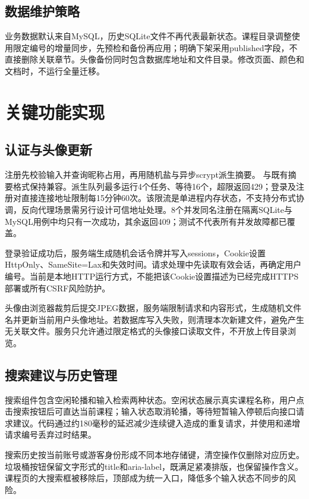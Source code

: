 \documentclass[UTF8,12pt,a4paper,oneside,openany]{ctexbook}
\begin{document}
\section{数据维护策略}

业务数据默认来自MySQL，历史SQLite文件不再代表最新状态。课程目录调整使用限定编号的增量同步，先预检和备份再应用；明确下架采用published字段，不直接删除关联章节。头像备份同时包含数据库地址和文件目录。修改页面、颜色和文档时，不运行全量迁移。


\chapter{关键功能实现}

\section{认证与头像更新}

注册先校验输入并查询昵称占用，再用随机盐与异步scrypt派生摘要。\cite{ref9} 与既有摘要格式保持兼容。派生队列最多运行4个任务、等待16个，超限返回429；登录及注册对直接连接地址限制每15分钟60次。该限流是单进程内存状态，不支持分布式协调，反向代理场景需另行设计可信地址处理。8个并发同名注册在隔离SQLite与MySQL用例中均只有一次成功，其余返回409；测试不代表所有并发故障都已覆盖。


登录验证成功后，服务端生成随机会话令牌并写入sessions，Cookie设置HttpOnly、SameSite=Lax和失效时间。请求处理中先读取有效会话，再确定用户编号。当前是本地HTTP运行方式，不能把该Cookie设置描述为已经完成HTTPS部署或所有CSRF风险防护。


头像由浏览器裁剪后提交JPEG数据，服务端限制请求和内容形式，生成随机文件名并更新当前用户头像地址。若数据库写入失败，则清理本次新建文件，避免产生无关联文件。服务只允许通过限定格式的头像接口读取文件，不开放上传目录浏览。


\section{搜索建议与历史管理}

搜索组件包含空闲轮播和输入检索两种状态。空闲状态展示真实课程名称，用户点击搜索按钮后可直达当前课程；输入状态取消轮播，等待短暂输入停顿后向接口请求建议。代码通过约180毫秒的延迟减少连续键入造成的重复请求，并使用和递增请求编号丢弃过时结果。


搜索历史按当前账号或游客身份形成不同本地存储键，清空操作仅删除对应历史。垃圾桶按钮保留文字形式的title和aria-label，既满足紧凑排版，也保留操作含义。课程页的大搜索框被移除后，顶部成为统一入口，降低多个输入状态不同步的风险。
\end{document}
